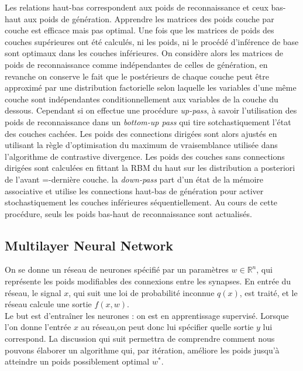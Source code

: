 \documentclass{article}
\theoremstyle{definition}
\newcommand{\R}{\mathbb R}
\begin{document}
\noindent Les relations haut-bas correspondent aux poids de reconnaissance et ceux bas-haut aux poids de génération. Apprendre les matrices des poids couche par couche est efficace mais pas optimal. Une fois que les matrices de poids des couches supérieures ont été calculés, ni les poids, ni le procédé d'inférence de base sont optimaux dans les couches inférieures. On considère alors les matrices de poids de reconnaissance comme indépendantes de celles de génération, en revanche on conserve le fait que le postérieurs de chaque couche peut être approximé par une distribution factorielle selon laquelle les variables d'une même couche sont indépendantes conditionnellement aux variables de la couche du dessous.  Cependant si on effectue une procédure \textit{up-pass}, à savoir l'utilisation des poids de reconnaissance dans un \textit{bottom-up pass} qui tire sotchastiquement l'état des couches cachées. Les poids des connections dirigées sont alors ajustés en utilisant la règle d'optimisation du maximum de vraisemblance utilisée dans l'algorithme de contrastive divergence. Les poids des couches sans connections dirigées sont calculées en fittant la RBM du haut sur les distribution a posteriori de l'avant =-dernière couche. la \textit{down-pass} part d'un état de la mémoire associative et utilise les connections haut-bas de génération pour activer stochastiquement les couches inférieures séquentiellement. Au cours de cette procédure, seuls les poids bas-haut de reconnaissance sont actualisés.

\subsection{Multilayer Neural Network}

On se donne un réseau de neurones spécifié par un paramètres $w\in \R^n$, qui représente les poids modifiables des connexions entre les synapses. En entrée du réseau, le signal $x$, qui suit une loi de probabilité inconnue $q(x)$, est traité, et le réseau calcule une sortie $f(x,w)$. \\

Le but est d'entraîner les neurones : on est en apprentissage supervisé. Lorsque l'on donne l'entrée $x$ au réseau,on peut donc lui spécifier quelle sortie $y$ lui correspond. La discussion qui suit permettra de comprendre comment nous pouvons élaborer un algorithme qui, par itération, améliore les poids jusqu'à atteindre un poids possiblement optimal $w^*$.\\
\end{document}
